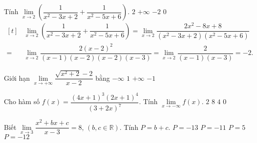 \begin{ex}%
	Tính $\lim\limits_{x\to 2} \left( \dfrac {1}{x^2-3x+2}+\dfrac {1}{x^2-5x+6} \right)$.
	\choice
	{$2 $}
	{$+\infty$}
	{\True $-2$}
	{$0$}
	\loigiai
	{\allowdisplaybreaks
	$\begin{aligned}[t]
	&\lim\limits_{x\to 2} \left( \dfrac {1}{x^2-3x+2}+\dfrac {1}{x^2-5x+6} \right)=\lim\limits_{x\to 2} \dfrac {2x^2-8x+8}{\left(x^2-3x+2 \right) \left(x^2-5x+6\right)}\\
	=&\lim\limits_{x\to 2} \dfrac {2(x-2)^2}{(x-1)(x-2)(x-2)(x-3)}=\lim\limits_{x\to 2} \dfrac {2}{(x-1)(x-3)}=-2.
	\end{aligned}$
}
\end{ex}
\begin{ex}%
	Giới hạn $\lim \limits_{ x \to + \infty} \dfrac {\sqrt {x ^2  + 2} - 2} {x - 2}$ bằng
	\choice
	{$- \infty$}
	{\True $1$}
	{$+\infty$}
	{$-1$}
\end{ex}
\begin{ex}%
Cho hàm số $ f(x)=\dfrac {(4x+1)^3(2x+1)^4}{(3+2x)^7}$. Tính $\lim\limits_{x\to -\infty}f(x)$.
\choice
{$2$}
{\True $8$}
{$4$}
{$0$}
\end{ex}
\begin{ex}%
	Biết $\lim\limits_{x\to 3} \dfrac {x^2+bx+c}{x-3}=8$, $(b,c\in \mathbb{R})$. Tính $P=b+c$.
	\choice
	{\True $P=-13$}
	{$P=-11$}
	{$P=5$}
	{$P=-12 $}
\end{ex}

